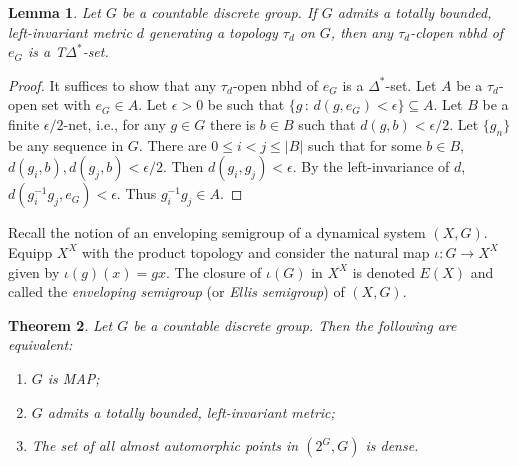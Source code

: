 \documentclass[11pt]{amsart}
\newtheorem{theorem}{Theorem}[section]
\newtheorem{lemma}[theorem]{Lemma}
\theoremstyle{definition}
\numberwithin{equation}{section}
\theoremstyle{definition}
\begin{document}
\begin{lemma}\label{lem:tbli} Let $G$ be a countable discrete group. If $G$ admits a totally bounded, left-invariant metric $d$ generating a topology $\tau_d$ on $G$, then any $\tau_d$-clopen nbhd of $e_G$ is a T$\Delta^*$-set.
\end{lemma}

\begin{proof} It suffices to show that any $\tau_d$-open nbhd of $e_G$ is a $\Delta^*$-set. Let $A$ be a $\tau_d$-open set with $e_G\in A$. Let $\epsilon>0$ be such that $\{g\,:\, d(g, e_G)<\epsilon\}\subseteq A$. Let $B$ be a finite $\epsilon/2$-net, i.e., for any $g\in G$ there is $b\in B$ such that $d(g, b)<\epsilon/2$. Let $\{g_n\}$ be any sequence in $G$. There are $0\leq i<j\leq |B|$ such that for some $b\in B$, $d(g_i, b), d(g_j, b)<\epsilon/2$. Then $d(g_i, g_j)<\epsilon$. By the left-invariance of $d$, $d(g_i^{-1}g_j, e_G)<\epsilon$. Thus $g_i^{-1}g_j\in A$.
\end{proof}

Recall the notion of an enveloping semigroup of a dynamical system $(X, G)$. Equipp $X^X$ with the product topology and consider the natural map $\iota\colon G\to X^X$ given by $\iota(g)(x)=gx$. The closure of $\iota(G)$ in $X^X$ is denoted $E(X)$ and called the {\em enveloping semigroup} (or {\em Ellis semigroup}) of $(X, G)$. 

\begin{theorem} Let $G$ be a countable discrete group. Then the following are equivalent:
\begin{enumerate}
\item[(1)] $G$ is MAP;
\item[(2)] $G$ admits a totally bounded, left-invariant metric;
\item[(3)] The set of all almost automorphic points in $(2^G, G)$ is dense. 
\end{enumerate}
\end{theorem}
\end{document}
